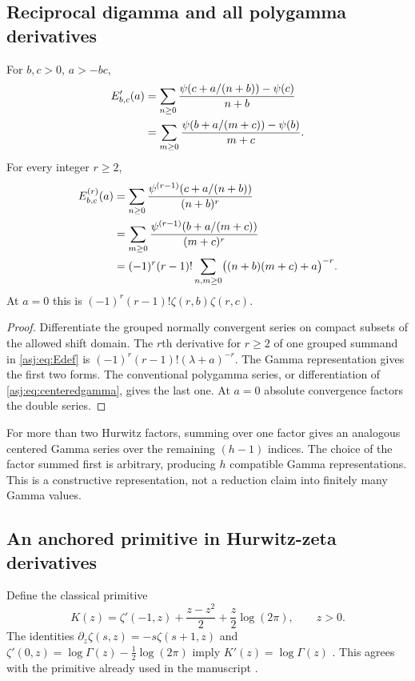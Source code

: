 \subsection{Reciprocal digamma and all polygamma derivatives}
\begin{corollary}\label{asj:thm:polygamma}
For $b,c>0$, $a>-bc$,
\begin{align}\label{asj:eq:digamma-reciprocity}
 E_{b,c}'(a)
 &=\sum_{n\ge0}\frac{\psi(c+a/(n+b))-\psi(c)}{n+b}\notag\\
 &=\sum_{m\ge0}\frac{\psi(b+a/(m+c))-\psi(b)}{m+c}.
\end{align}
For every integer $r\ge2$,
\begin{align}\label{asj:eq:polygamma-reciprocity}
 E_{b,c}^{(r)}(a)
 &=\sum_{n\ge0}\frac{\psi^{(r-1)}(c+a/(n+b))}{(n+b)^r}\notag\\
 &=\sum_{m\ge0}\frac{\psi^{(r-1)}(b+a/(m+c))}{(m+c)^r}\notag\\
 &=(-1)^r(r-1)!\sum_{n,m\ge0}
                       \bigl((n+b)(m+c)+a\bigr)^{-r}.
\end{align}
At $a=0$ this is $(-1)^r(r-1)!\zeta(r,b)\zeta(r,c)$.
\end{corollary}
\begin{proof}
Differentiate the grouped normally convergent series on compact subsets
of the allowed shift domain. The $r$th derivative for $r\ge2$ of one
grouped summand in \eqref{asj:eq:Edef} is
$(-1)^r(r-1)!(\lambda+a)^{-r}$. The Gamma representation gives the
first two forms. The conventional polygamma series, or differentiation
of \eqref{asj:eq:centeredgamma}, gives the last one. At $a=0$ absolute
convergence factors the double series.
\end{proof}

For more than two Hurwitz factors, summing over one factor gives an
analogous centered Gamma series over the remaining $(h-1)$ indices.
The choice of the factor summed first is arbitrary, producing $h$
compatible Gamma representations. This is a constructive representation,
not a reduction claim into finitely many Gamma values.

\subsection{An anchored primitive in Hurwitz-zeta derivatives}
Define the classical primitive
\begin{equation}\label{asj:eq:Kdef}
 K(z)=\zeta'(-1,z)+\frac{z-z^2}{2}+\frac z2\log(2\pi),\qquad z>0.
\end{equation}
The identities $\partial_z\zeta(s,z)=-s\zeta(s+1,z)$ and
$\zeta'(0,z)=\log\Gamma(z)-\tfrac12\log(2\pi)$ imply
$K'(z)=\log\Gamma(z)$ \cite{dlmf-hurwitz}. This agrees with the
primitive already used in the manuscript \cite{repo}.

